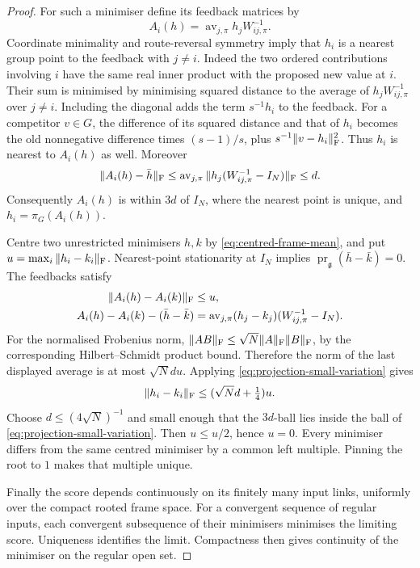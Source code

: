 \documentclass[11pt,reqno]{amsart}
\numberwithin{equation}{section}
\theoremstyle{definition}
\theoremstyle{remark}
\newcommand{\g}{\mathfrak g}
\begin{document}
\begin{proof}
For such a minimiser define its feedback matrices by
\[
                 A_i(h)=\operatorname{av}_{j,\pi}
                                      h_jW_{ij,\pi}^{-1}.
\]
Coordinate minimality and route-reversal symmetry imply that
\(h_i\) is a nearest group point to the feedback with \(j\ne i\).
Indeed the two ordered contributions involving \(i\) have the
same real inner product with the proposed new value at \(i\).
Their sum is minimised by minimising squared distance to the
average of \(h_jW_{ij,\pi}^{-1}\) over \(j\ne i\).
Including the diagonal adds the term \(s^{-1}h_i\) to the
feedback. For a competitor \(v\in G\), the difference of its
squared distance and that of \(h_i\) becomes the old nonnegative
difference times \((s-1)/s\), plus
\(s^{-1}\|v-h_i\|_{\rm F}^2\). Thus \(h_i\) is nearest to
\(A_i(h)\) as well. Moreover
\[
    \|A_i(h)-\bar h\|_{\rm F}
       \le\operatorname{av}_{j,\pi}
                  \|h_j(W_{ij,\pi}^{-1}-I_N)\|_{\rm F}\le d.
\]
Consequently \(A_i(h)\) is within \(3d\) of \(I_N\), where the
nearest point is unique, and \(h_i=\pi_G(A_i(h))\).

Centre two unrestricted minimisers \(h,k\) by
\eqref{eq:centred-frame-mean}, and put
\(u=\max_i\|h_i-k_i\|_{\rm F}\).
Nearest-point stationarity at \(I_N\) implies
\(\operatorname{pr}_{\g}(\bar h-\bar k)=0\).
The feedbacks satisfy
\begin{align*}
 \|A_i(h)-A_i(k)\|_{\rm F}&\le u,\\
 A_i(h)-A_i(k)-(\bar h-\bar k)
       &=\operatorname{av}_{j,\pi}
                    (h_j-k_j)(W_{ij,\pi}^{-1}-I_N).
\end{align*}
For the normalised Frobenius norm,
\(\|AB\|_{\rm F}\le\sqrt N\|A\|_{\rm F}\|B\|_{\rm F}\),
by the corresponding Hilbert--Schmidt product bound. Therefore
the norm of the last displayed average is at most \(\sqrt Ndu\).
Applying \eqref{eq:projection-small-variation} gives
\[
          \|h_i-k_i\|_{\rm F}\le(\sqrt N d+\tfrac14)u.
\]
Choose \(d\le(4\sqrt N)^{-1}\) and small enough that the
\(3d\)-ball lies inside the ball of
\eqref{eq:projection-small-variation}. Then \(u\le u/2\), hence
\(u=0\). Every minimiser differs from the same centred minimiser
by a common left multiple. Pinning the root to \(1\) makes that
multiple unique.

Finally the score depends continuously on its finitely many
input links, uniformly over the compact rooted frame space.
For a convergent sequence of regular inputs, each convergent
subsequence of their minimisers minimises the limiting score.
Uniqueness identifies the limit. Compactness then gives continuity
of the minimiser on the regular open set.
\end{proof}
\end{document}
